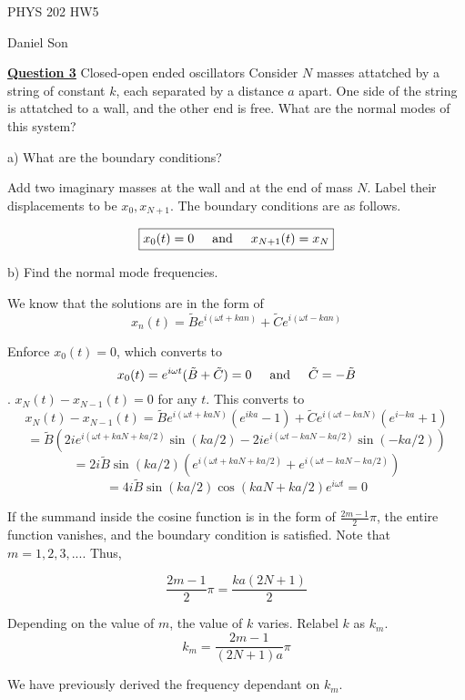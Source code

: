 \documentclass{article}
\newcommand{\new}[1]{
    \vspace{2mm}
    \noindent
    \textbf{
    \underline{#1}}
}
\newcommand{\textAnd}{
    {
        \hspace{5mm}
        \textrm{and}
        \hspace{5mm}
    }
}
\newcommand{\Ixp}[1]{
    {
        e^{i{#1}}
    }
}
\begin{document}
\begin{center}
\LARGE
PHYS 202 HW5

\Large
Daniel Son
\end{center}

\normalsize 

\new{Question 3} Closed-open ended oscillators 
Consider $N$ masses attatched by a string of constant $k$, 
each separated by a distance $a$ apart. One side of the 
string is attatched to a wall, and the other end is free. 
What are the normal modes of this system?

\noindent
a) What are the boundary conditions?

Add two imaginary masses at the wall and at the end of mass $N$. 
Label their displacements to be $x_0, x_{N+1}$. The boundary conditions 
are as follows.

\[
    \boxed{
    x_0(t) = 0 \textAnd x_{N+1}(t) = x_{N}
    }
\]

\noindent
b) Find the normal mode frequencies. 

We know that the solutions are in the form of 
\[
    x_n(t) = 
    \tilde{B} {
        \Ixp{(\omega t + k a n )}
    }
    +
    \tilde{C} {
        \Ixp{(\omega t - k a n)}
    }
\]

Enforce $x_0(t) = 0$, which converts to 
\[
    x_0(t) = \Ixp{
        \omega t
    }
    (\tilde{B} + \tilde{C}) = 0 
    \textAnd \tilde{C} = -\tilde{B}
\]. $x_N(t) - x_{N-1}(t) = 0$ for any $t$. This converts to 
\[
    x_N(t) - x_{N-1}(t) = 
    \tilde{B}\Ixp{(\omega t + kaN)}(
        \Ixp{ka} - 1
    )
    +
    \tilde{C}\Ixp{(\omega t - kaN)}(
        \Ixp{-ka} + 1
    )
\]
\[
    = \tilde{B} \left(
        2i\Ixp{(\omega t + kaN + ka/2)} \sin(ka/2) 
        - 2i\Ixp{(\omega t - kaN - ka/2)} \sin(-ka/2) 
    \right)
\]
\[
    = 2i\tilde{B} \sin(ka/2) 
    \left(
        \Ixp{(\omega t + kaN + ka/2)}
        + \Ixp{(\omega t - kaN - ka/2)}
    \right)
\]
\[
    = 4i \tilde{B} \sin(ka/2) \cos(kaN + ka/2) \Ixp{\omega t} = 0
\]

If the summand inside the cosine function is in the form of 
$\frac{2m - 1}{2} \pi$, the entire function vanishes, and the 
boundary condition is satisfied. Note that $m = {1, 2, 3, ...}$.  Thus, 

\[
    \frac{2m - 1}{2} \pi = 
    \frac{ka(2N + 1)}{2}
\]

Depending on the value of $m$, the value of $k$ varies. Relabel 
$k$ as $k_m$. 
\[
    k_m = \frac{2m - 1}{(2N + 1)a}\pi
\]

We have previously derived the frequency dependant on $k_m$. 
\end{document}
